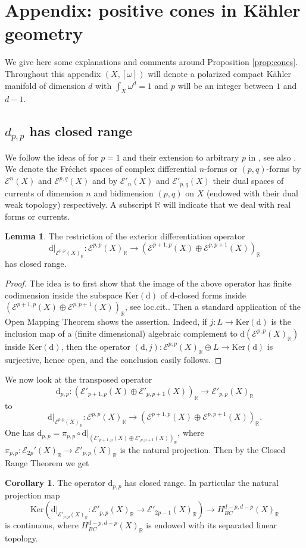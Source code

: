 \documentclass[a4,reqno]{amsart}
\theoremstyle{definition}
\newtheorem{lemma}[theorem]{Lemma}
\newtheorem{corollary}[theorem]{Corollary}
\def\cE{\mathcal E}
\newcommand{\R}{\mathbb{R}}
\def\d{\mbox{d}}
\def\Ker{\mbox{Ker}}
\numberwithin{equation}{section}
\begin{document}
\section{Appendix: positive cones in K\"ahler geometry}\label{sect:appendix}


We give here some explanations and comments around Proposition \ref{prop:cones}. Throughout this appendix $(X,[\omega])$ will denote a polarized compact K\"ahler manifold of dimension $d$ with $\int_X\omega^d=1$ and $p$ will be an integer between $1$ and $d-1$.
\subsection{$d_{p,p}$ has closed range}
We follow the ideas of \cite[2]{HarveyLawson} for $p=1$ and their extension to arbitrary $p$ in \cite{AlessandriniAndreatta}, see also \cite{Alessandrini}. 
We denote the Fr\'echet spaces of complex differential $n$-forms or $(p,q)$-forms by $\cE^{n}(X)$ and $\cE^{p,q}(X)$ and by $\cE'_{n}(X)$ and $\cE'_{p,q}(X)$ their dual spaces of currents of dimension $n$ and bidimension $(p,q)$ on $X$ (endowed with their dual weak topology) respectively. A subscript $\R$ will indicate that we deal with real forms or currents. 

\begin{lemma}
    The restriction of the exterior differentiation operator 
    $$\d|_{\cE^{p,p}(X)_\R}:  \cE^{p,p}(X)_\R\to (\cE^{p+1,p}(X)\oplus\cE^{p,p+1}(X))_\R  $$ 
    has closed range. 
\end{lemma}

\begin{proof}
    The idea is to first show that the image of the above operator has finite codimension inside the subspace $\Ker(\d)$ of $\d$-closed forms inside  $(\cE^{p+1,p}(X)\oplus\cE^{p,p+1}(X))_\R$, see loc.cit.. Then a standard application of the Open Mapping Theorem shows the assertion. Indeed, if $j:L\to \Ker(\d)$ is the inclusion map of a (finite dimensional) algebraic complement to $\d(\cE^{p,p}(X)_\R)$ inside $\Ker(\d)$, then the operator $(\d,j):\cE^{p,p}(X)_\R\oplus L\to \Ker(\d)$ is surjective, hence open, and the conclusion easily follows.\end{proof}

We now look at the transposed operator
$$\d_{p,p}: (\cE'_{p+1,p}(X)\oplus\cE'_{p,p+1}(X))_\R \to \cE'_{p,p}(X)_\R$$
to
$$\d|_{\cE^{p,p}(X)_\R}:  \cE^{p,p}(X)_\R\to (\cE^{p+1,p}(X)\oplus\cE^{p,p+1}(X))_\R. $$
One has  $\d_{p,p}=\pi_{p,p}\circ\d|_{(\cE'_{p+1,p}(X)\oplus\cE'_{p,p+1}(X))_\R}$, where $\pi_{p,p}:\cE_{2p}'(X)_\R\to \cE'_{p,p}(X)_\R$ is the natural projection. Then by the Closed Range Theorem we get
\begin{corollary}\label{cor:ClosedRange}
  The operator $\d_{p,p}$ has closed range. In particular the natural projection map 
  $$\Ker(\d|_{\cE'_{p,p}(X)_\R}:\cE'_{p,p}(X)_\R\to \cE'_{2p-1}(X)_\R)\longrightarrow H^{d-p,d-p}_{BC}(X)_\R$$
  is continuous, where $H^{d-p,d-p}_{BC}(X)_\R$ is endowed with its separated linear topology. 
\end{corollary}
\end{document}
